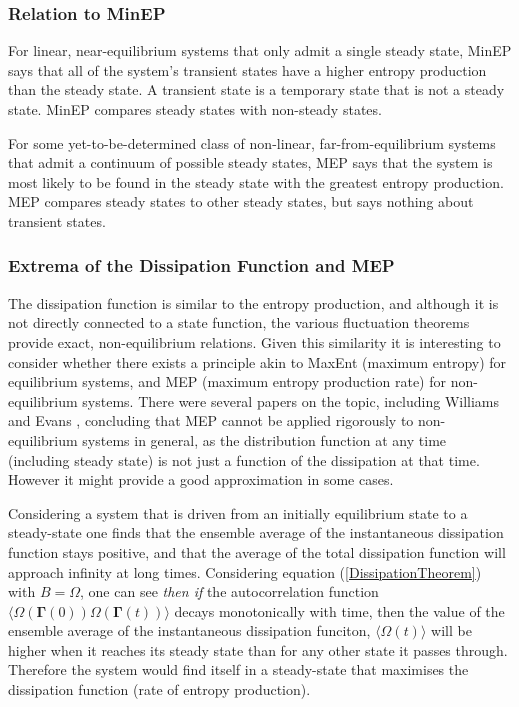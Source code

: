 \documentclass[a4paper,12pt]{article}
\begin{document}
\subsubsection{Relation to MinEP}
For linear, near-equilibrium systems that only admit a single steady state, MinEP says that all of the system's transient states have a higher entropy production than the steady state. A transient state is a temporary state that is not a steady state. MinEP compares steady states with non-steady states.

For some yet-to-be-determined class of non-linear, far-from-equilibrium systems that admit a continuum of possible steady states, MEP says that the system is most likely to be found in the steady state with the greatest entropy production. MEP compares steady states to other steady states, but says nothing about transient states.


\subsubsection{Extrema of the Dissipation Function and MEP}
The dissipation function is similar to the entropy production, and although it is not directly connected to a state function, the various fluctuation theorems provide exact, non-equilibrium relations. Given this similarity it is interesting to consider whether there exists a principle akin to MaxEnt (maximum entropy) for equilibrium systems, and MEP (maximum entropy production rate) for non-equilibrium systems. There were several papers on the topic, including Williams and Evans \cite{Williams:2008ft}, concluding that MEP cannot be applied rigorously to non-equilibrium systems in general, as the distribution function at any time (including steady state) is not just a function of the dissipation at that time. However it might provide a good approximation in some cases.

Considering a system that is driven from an initially equilibrium state to a steady-state one finds that the ensemble average of the instantaneous dissipation function stays positive, and that the average of the total dissipation function will approach infinity at long times. Considering equation (\ref{DissipationTheorem}) with $B=\Omega$, one can see \textit{then if} the autocorrelation function $\langle \Omega(\bm{\Gamma}(0))\Omega(\bm{\Gamma}(t))\rangle$ decays monotonically with time, then the value of the ensemble average of the instantaneous dissipation funciton, $\langle \Omega(t) \rangle$ will be higher when it reaches its steady state than for any other state it passes through. Therefore the system would find itself in a steady-state that maximises the dissipation function (rate of entropy production).
\end{document}

